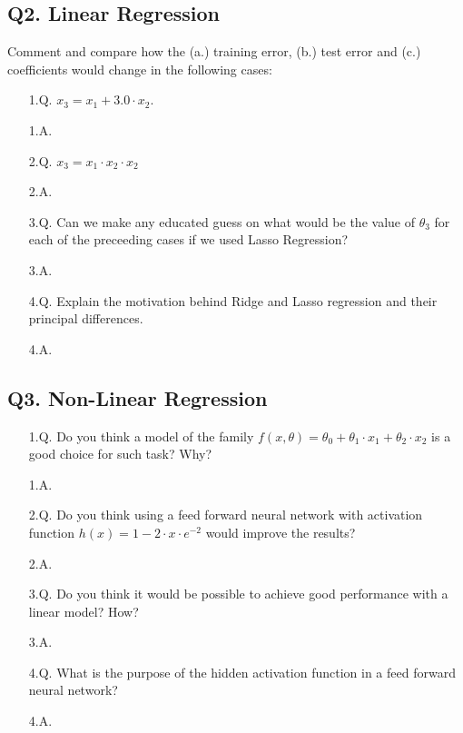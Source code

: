 \documentclass[11pt]{scrartcl}
\begin{document}
\subsection{Q2. Linear Regression}
Comment and compare how the (a.) training error, (b.) test error and (c.) coefficients would change in the following cases:
\begin{itemize}
\item[1.Q.] $x_3 = x_1 + 3.0 \cdot x_2$.
\item[1.A.] ~\\
\item[2.Q.] $x_3 = x_1 \cdot x_2 \cdot x_2$
\item[2.A.] ~\\
\item[3.Q.] Can we make any educated guess on what would be the value of $\theta_3$ for each of the preceeding cases if we used Lasso Regression?
\item[3.A.] ~\\
\item[4.Q.] Explain the motivation behind Ridge and Lasso regression and their principal differences.
\item[4.A.] ~\\  
\end{itemize}

\subsection{Q3. Non-Linear Regression}
\begin{itemize}
\item[1.Q.] Do you think a model of the family $f(x, \theta) = \theta_0 + \theta_1 \cdot x_1 + \theta_2 \cdot x_2$ is a good choice for such task? Why?
\item[1.A.] ~\\
\item[2.Q.] Do you think using a feed forward neural network with activation function $h(x) = 1 - 2 \cdot x \cdot e^{-2}$ would improve the results?
\item[2.A.] ~\\
\item[3.Q.] Do you think it would be possible to achieve good performance with a linear model? How?
\item[3.A.] ~\\
\item[4.Q.] What is the purpose of the hidden activation function in a feed forward neural network? 
\item[4.A.] ~\\ 
\end{itemize}
\end{document}
